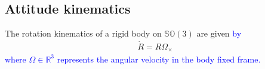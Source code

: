 \documentclass{article}
\newcommand{\SOthree}{\mathbb{SO}(3)}
\newcommand{\R}[1]{\mathbb{R}^{#1}}
\newcommand{\dotR}{\dot{R}}
\newcommand{\Omegay}{\Omega^y}
\newtheorem{assumption}{Assumption}
\newtheorem{definition}{Definition}
\newtheorem{proposition}{Proposition}
\newcommand{\textblue}[1]{\textcolor{blue}{#1}}
\newcommand{\normSOthree}[1]{{{\vert}#1 {\vert}_I}}
\newcommand{\cross}[1]{{#1}_\times}
\newcommand{\neighbourhood}[2]{\mathcal{N}_{#1}(#2)}
\begin{document}




\subsection{Attitude kinematics}
The rotation kinematics of a rigid body on $\SOthree$ are given \textblue{by}  
\begin{align}\label{eq:rotationKinematics}
    \dotR = R\cross{\Omega}
\end{align}
\textblue{where $\Omega\in\R{3}$ represents the angular velocity in the body fixed frame.}
\end{document}
